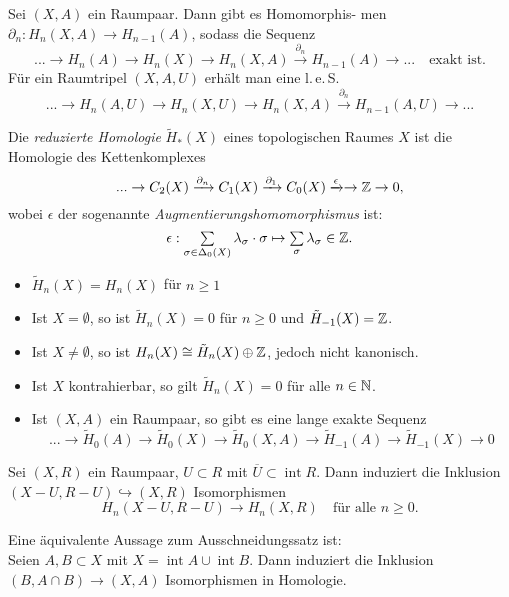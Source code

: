 \documentclass{cheat-sheet}
\newcommand{\RH}{\tilde{H}} %
\newcommand{\inte}{\mathop{\mathrm{int}}} %
\newcommand{\clos}[1]{\overline{#1}} %
\begin{document}
\begin{kor}
  Sei $(X, A)$ ein Raumpaar. Dann gibt es Homomorphis- men $\partial_n : H_n(X, A) \to H_{n-1}(A)$, sodass die Sequenz
  \[
    ... \to H_n(A) \to H_n(X) \to H_n(X, A) \xrightarrow{\partial_n} H_{n-1}(A) \to ...
    \quad \text{exakt ist.}
  \]
  Für ein Raumtripel $(X, A, U)$ erhält man eine l.\,e.\,S.
  \[
    ... \to H_n(A, U) \to H_n(X, U) \to H_n(X, A) \xrightarrow{\partial_n} H_{n-1}(A, U) \to ...
  \]
\end{kor}

\begin{defn}
  Die \emph{reduzierte Homologie} $\RH_*(X)$ eines topologischen Raumes $X$ ist die Homologie des Kettenkomplexes
  \[ ... \to C_2(X) \xrightarrow{\partial_n} C_1(X) \xrightarrow{\partial_1} C_0(X) \xrightarrow{\epsilon} \to \mathbb{Z} \to 0, \]
  wobei $\epsilon$ der sogenannte \emph{Augmentierungshomomorphismus} ist:
  \[ \epsilon : \sum_{\sigma \in \Delta_0(X)} \lambda_\sigma \cdot \sigma \mapsto \sum_{\sigma} \lambda_\sigma \in \Z. \]
\end{defn}

\begin{prop}
  \begin{itemize}
    \item $\RH_n(X) = H_n(X)$ für $n \geq 1$
    \item Ist $X = \emptyset$, so ist $\RH_n(X) = 0$ für $n \geq 0$ und $\RH_{-1}(X) = \Z$.
    \item Ist $X \not= \emptyset$, so ist $H_n(X) \cong \RH_n(X) \oplus \Z$, jedoch nicht kanonisch.
    \item Ist $X$ kontrahierbar, so gilt $\RH_n(X) = 0$ für alle $n \in \mathbb{N}$.
    \item Ist $(X, A)$ ein Raumpaar, so gibt es eine lange exakte Sequenz
    \[ ... \to \RH_0(A) \to \RH_0(X) \to \RH_0(X,A) \to \RH_{-1}(A) \to \RH_{-1}(X) \to 0 \]
  \end{itemize}
\end{prop}


\begin{satz}
  Sei $(X, R)$ ein Raumpaar, $U \subset R$ mit $\clos{U} \subset \inte R$. Dann induziert die Inklusion $(X - U, R - U) \hookrightarrow (X, R)$ Isomorphismen
  \[ H_n(X - U, R - U) \to H_n(X, R) \quad \text{für alle $n \geq 0$.} \]
\end{satz}

\begin{bem}
  Eine äquivalente Aussage zum Ausschneidungssatz ist:\\
  Seien $A, B \subset X$ mit $X = \inte A \cup \inte B$. Dann induziert die Inklusion $(B, A \cap B) \to (X, A)$ Isomorphismen in Homologie.
\end{bem}
\end{document}
